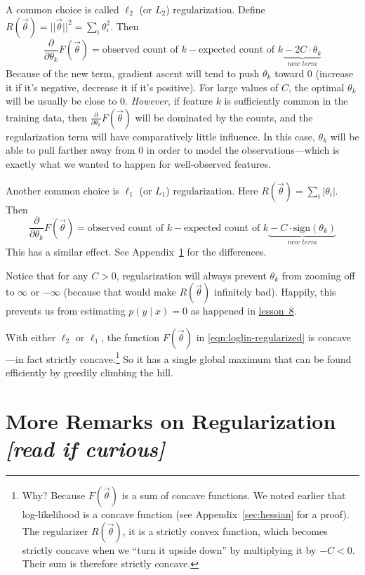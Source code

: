 \documentclass[11pt]{article}
\newcommand{\vtheta}{\vec{\theta}}
\newcommand{\diffk}{\frac{\partial}{\partial \theta_k}}
\newcommand{\lesson}[1]{\href{http://cs.jhu.edu/~jason/tutorials/loglin/\##1}{lesson~#1}}
\begin{document}
A common choice is called $\ell_2$ (or $L_2$) regularization.  Define
$R(\vtheta) = ||\vtheta||^2 = \sum_i \theta_i^2$.  Then
\begin{equation}
  \diffk F(\vtheta) = \textrm{observed count of $k$} -
  \textrm{expected count of $k$} \underbrace{\mbox{}-2C \cdot
    \theta_k}_{\textit{new term}}
\end{equation}
Because of the new term, gradient ascent will tend to push $\theta_k$
toward 0 (increase it if it's negative, decrease it if it's positive).
For large values of $C$, the optimal $\theta_k$ will be usually be
close to 0.  {\em However,} if feature $k$ is sufficiently common in the
training data, then $\diffk F(\vtheta)$ will be dominated by the
counts, and the regularization term will have comparatively little
influence.  In this case, $\theta_k$ will be able to pull farther away
from 0 in order to model the observations---which is exactly what we
wanted to happen for well-observed features.

Another common choice is $\ell_1$ (or $L_1$) regularization.  Here
$R(\vtheta) = \sum_i |\theta_i|$.  Then
\begin{equation}
  \diffk F(\vtheta) = \textrm{observed count of $k$} -
  \textrm{expected count of $k$} \underbrace{\mbox{}-C\cdot \textrm{sign}(\theta_k)}_{\textit{new term}}
\end{equation}
This has a similar effect.  See Appendix~\ref{app:more-regularization} for the differences.

Notice that for any $C > 0$, regularization will always prevent
$\theta_k$ from zooming off to $\infty$ or $-\infty$ (because that
would make $R(\vtheta)$ infinitely bad).  Happily, this prevents us from
estimating $p(y\mid x)=0$ as happened in \lesson{8}.

With either $\ell_2$ or $\ell_1$, the function $F(\vtheta)$ in \eqref{eqn:loglin-regularized} is concave---in fact strictly concave.\footnote{Why? Because $F(\vtheta)$ is a sum of concave functions.  We noted earlier that log-likelihood is a concave function (see Appendix~\ref{sec:hessian} for a proof).  The regularizer $R(\vtheta)$, it is a strictly convex function, which becomes strictly concave when we ``turn it upside down'' by multiplying it by $-C < 0$.  Their sum is therefore strictly concave.} So it has a single global maximum that can be found efficiently by greedily climbing the hill.

\appendix
\clearpage
\section{More Remarks on Regularization {\em [read if curious]}}\label{app:more-regularization}
\end{document}
